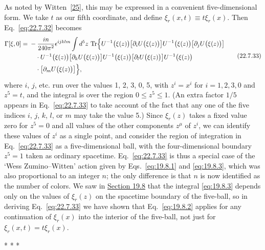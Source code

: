 As noted by Witten~\hyperref[ch22-ref-25]{[25]}, this may be expressed in
a convenient five-dimensional form. We take $t$ as our fifth coordinate,
and define $\xi_r(x,t)\equiv t\xi_r(x)$. Then Eq.~\eqref{eq:22.7.32}
becomes
\begin{equation}
 \begin{aligned}
 \Gamma[\xi,0]
 ={}&-\frac{in}{240\pi^2}\epsilon^{ijklm}\int d^5z\,
 \operatorname{Tr}\Bigl\{
 U^{-1}\bigl(\xi(z)\bigr)
 \bigl[\partial_iU\bigl(\xi(z)\bigr)\bigr]
 U^{-1}\bigl(\xi(z)\bigr)
 \bigl[\partial_jU\bigl(\xi(z)\bigr)\bigr]
 \\
 &\quad{}\cdot
 U^{-1}\bigl(\xi(z)\bigr)
 \bigl[\partial_kU\bigl(\xi(z)\bigr)\bigr]
 U^{-1}\bigl(\xi(z)\bigr)
 \bigl[\partial_lU\bigl(\xi(z)\bigr)\bigr]
 U^{-1}\bigl(\xi(z)\bigr)
 \\
 &\quad{}\cdot
 \bigl[\partial_mU\bigl(\xi(z)\bigr)\bigr]
 \Bigr\},
 \end{aligned}
 \tag{22.7.33}\label{eq:22.7.33}
\end{equation}
where $i$, $j$, etc. run over the values 1, 2, 3, 0, 5, with $z^i=x^i$
for $i=1,2,3,0$ and $z^5=t$, and the integral is over the region
$0\leq z^5\leq1$. (An extra factor $1/5$ appears in
Eq.~\eqref{eq:22.7.33} to take account of the fact that any one of the
five indices $i$, $j$, $k$, $l$, or $m$ may take the value 5.) Since
$\xi_r(z)$ takes a fixed value zero for $z^5=0$ and all values of the other
components $z^\mu$ of $z^i$, we can identify these values of $z^i$ as a
single point, and consider the region of integration in
Eq.~\eqref{eq:22.7.33} as a five-dimensional ball, with the
four-dimensional boundary $z^5=1$ taken as ordinary spacetime.
Eq.~\eqref{eq:22.7.33} is thus a special case of the
`Wess Zumino--Witten' action given by Eqs.~\eqref{eq:19.8.1} and
\eqref{eq:19.8.3}, which was also proportional to an integer $n$; the
only difference is that $n$ is now identified as the number of colors.
We saw in \hyperref[sec:19.8]{Section 19.8} that the integral
\eqref{eq:19.8.3} depends only on the values of $\xi_r(z)$ on the
spacetime boundary of the five-ball, so in deriving
Eq.~\eqref{eq:22.7.33} we have shown that Eq.~\eqref{eq:19.8.2} applies
for any continuation of $\xi_r(x)$ into the interior of the five-ball,
not just for $\xi_r(x,t)=t\xi_r(x)$.

\begin{center}
  * * *
\end{center}


